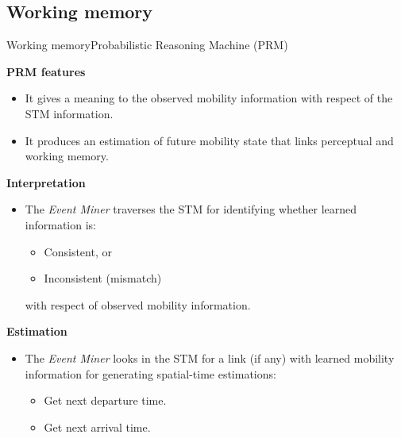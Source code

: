 \subsection{Working memory}
\begin{frame}{Working memory}{Probabilistic Reasoning Machine (PRM)}
\small
\begin{block}{\small \textbf{PRM features}}
\begin{itemize}
    \item It gives a meaning to the observed mobility information with respect of the STM information.
    \item It produces an estimation of future mobility state that links perceptual and working memory.
\end{itemize}
\end{block}

\begin{block}{\small \textbf{Interpretation}}
\begin{itemize}
  \item The \emph{Event Miner} traverses the STM for identifying whether learned information is:%
  \begin{itemize}
     \item Consistent, or
     \item Inconsistent (mismatch)
   \end{itemize}
   with respect of observed mobility information.
\end{itemize}
\end{block}

\begin{block}{\small \textbf{Estimation}}
\begin{itemize}
\item The \emph{Event Miner} looks in the STM for a link (if any) with learned mobility information for generating spatial-time estimations:
\begin{itemize}
  \item Get next departure time.
  \item Get next arrival time.
\end{itemize}
\end{itemize}
\end{block}

\end{frame}

